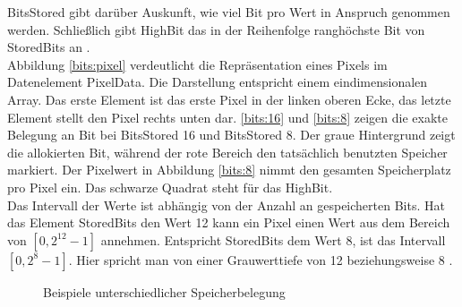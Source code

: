 BitsStored gibt darüber Auskunft, wie viel Bit pro Wert in Anspruch genommen werden. Schließlich gibt HighBit das in der Reihenfolge ranghöchste Bit von StoredBits an \cite[8.1.1]{dicom:structure}.\\
Abbildung \ref{bits:pixel} verdeutlicht die Repräsentation eines Pixels im Datenelement PixelData. Die Darstellung entspricht einem eindimensionalen Array. Das erste Element ist das erste Pixel in der linken oberen Ecke, das letzte Element stellt den Pixel rechts unten dar. \ref{bits:16} und \ref{bits:8} zeigen die exakte Belegung an Bit bei BitsStored 16 und BitsStored 8. Der graue Hintergrund zeigt die allokierten Bit, während der rote Bereich den tatsächlich benutzten Speicher markiert. Der Pixelwert in Abbildung \ref{bits:8} nimmt den gesamten Speicherplatz pro Pixel ein. Das schwarze Quadrat steht für das HighBit.\\
Das Intervall der Werte ist abhängig von der Anzahl an gespeicherten Bits. Hat das Element StoredBits den Wert 12 kann ein  Pixel einen Wert aus dem Bereich von $[0, 2^{12}-1]$ annehmen. Entspricht StoredBits dem Wert 8, ist das Intervall $[0, 2^8-1]$. Hier spricht man von einer Grauwerttiefe von 12 beziehungsweise 8 \cite[2.2]{handels:mbv}.
\begin{figure}[htb]
\centering
{}
\caption{Beispiele unterschiedlicher Speicherbelegung}
\label{bits}
\end{figure}

